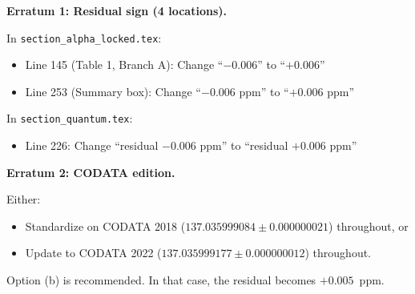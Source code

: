 \documentclass[11pt]{article}
\begin{document}
\begin{tcolorbox}[colback=red!5!white, colframe=red!50!black, title=Required Corrections]

\textbf{Erratum 1: Residual sign (4 locations).}

In \texttt{section\_alpha\_locked.tex}:
\begin{itemize}
\item Line 145 (Table 1, Branch A): Change ``$-0.006$'' to ``$+0.006$''
\item Line 253 (Summary box): Change ``$-0.006$ ppm'' to ``$+0.006$ ppm''
\end{itemize}

In \texttt{section\_quantum.tex}:
\begin{itemize}
\item Line 226: Change ``residual $-0.006$ ppm'' to ``residual $+0.006$ ppm''
\end{itemize}

\textbf{Erratum 2: CODATA edition.}

Either:
\begin{itemize}
\item[(a)] Standardize on CODATA 2018 ($137.035999084 \pm 0.000000021$) throughout, or
\item[(b)] Update to CODATA 2022 ($137.035999177 \pm 0.000000012$) throughout.
\end{itemize}
Option (b) is recommended. In that case, the residual becomes $+0.005$~ppm.

\end{tcolorbox}
\end{document}
